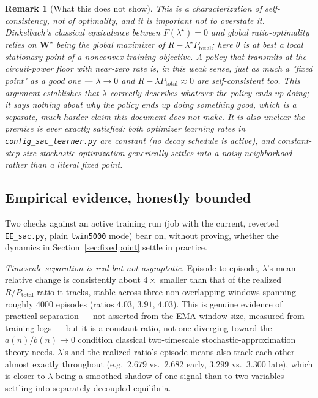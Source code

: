 \documentclass[11pt]{article}
\newtheorem{remark}{Remark}
\begin{document}
\begin{remark}[What this does not show]
This is a characterization of self-consistency, not of optimality, and it
is important not to overstate it. Dinkelbach's classical equivalence between
$F(\lambda^\star)=0$ and global ratio-optimality relies on $\mathbf{W}^\star$
being the \emph{global} maximizer of $R-\lambda^\star P_\text{total}$; here
$\theta$ is at best a local stationary point of a nonconvex training
objective. A policy that transmits at the circuit-power floor with near-zero
rate is, in this weak sense, just as much a "fixed point" as a good one ---
$\lambda\to 0$ and $R-\lambda P_\text{total}\approx 0$ are self-consistent
too. This argument establishes that $\lambda$ correctly describes whatever
the policy ends up doing; it says nothing about why the policy ends up doing
something good, which is a separate, much harder claim this document does
not make. It is also unclear the premise is ever exactly satisfied: both
optimizer learning rates in \texttt{config\_sac\_learner.py} are constant
(no decay schedule is active), and constant-step-size stochastic
optimization generically settles into a noisy neighborhood rather than a
literal fixed point.
\end{remark}

\subsection{Empirical evidence, honestly bounded}
\label{sec:empirical-evidence}

Two checks against an active training run (job with the current, reverted
\texttt{EE\_sac.py}, plain \texttt{lwin5000} mode) bear on, without proving,
whether the dynamics in Section~\ref{sec:fixedpoint} settle in practice.

\emph{Timescale separation is real but not asymptotic.} Episode-to-episode,
$\lambda$'s mean relative change is consistently about $4\times$ smaller
than that of the realized $R/P_\text{total}$ ratio it tracks, stable across
three non-overlapping windows spanning roughly $4000$ episodes (ratios
$4.03$, $3.91$, $4.03$). This is genuine evidence of practical separation ---
not asserted from the EMA window size, measured from training logs --- but
it is a constant ratio, not one diverging toward the
$a(n)/b(n)\to 0$ condition classical two-timescale stochastic-approximation
theory needs. $\lambda$'s and the realized ratio's episode means also track
each other almost exactly throughout (e.g.\ $2.679$ vs.\ $2.682$ early,
$3.299$ vs.\ $3.300$ late), which is closer to $\lambda$ being a smoothed
shadow of one signal than to two variables settling into separately-decoupled
equilibria.
\end{document}
